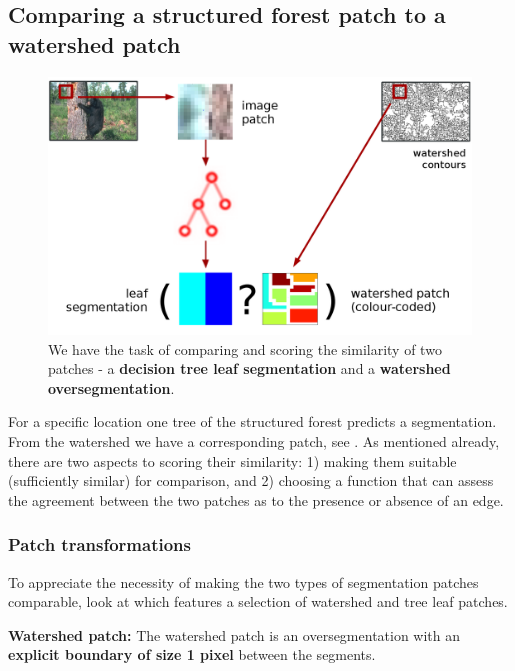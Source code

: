 \subsection{Comparing a structured forest patch to a watershed patch}
\begin{figure}[t]
\centering
 \includegraphics[width=1\textwidth]{images/SE-SV-UCM/weighting-the-watershed-contours-two-patches.png}
\caption[Structured voting essence: a comparison of two patches]{We have the task of comparing and scoring the similarity of two patches - a \textbf{decision tree leaf segmentation} and a \textbf{watershed oversegmentation}.}
\label{fig:weighting-the-watershed-contours}
\end{figure}

For a specific location one tree of the structured forest predicts a segmentation. From the watershed we have a corresponding patch, see . As mentioned already, there are two aspects to scoring their similarity: 1) making them suitable (\ie sufficiently similar) for comparison, and 2) choosing a function that can assess the agreement between the two patches as to the presence or absence of an edge.

\subsubsection{Patch transformations}
\label{sec:ch4-patch-transformations}
To appreciate the necessity of making the two types of segmentation patches comparable, look at  which features a selection of watershed and tree leaf patches.

\textbf{Watershed patch:} The watershed patch is an oversegmentation with an \textbf{explicit boundary of size 1 pixel} between the segments.

